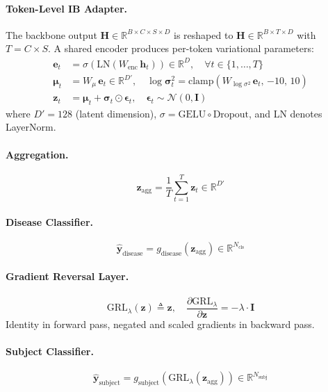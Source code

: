 \documentclass{article}
\newcommand{\R}{\mathbb{R}}
\newcommand{\mN}{\mathcal{N}}
\newcommand{\bz}{\bm{z}}
\newcommand{\bmu}{\bm{\mu}}
\newcommand{\bsigma}{\bm{\sigma}}
\begin{document}
\paragraph{Token-Level IB Adapter.}
The backbone output $\bm{H} \in \R^{B \times C \times S \times D}$ is reshaped to $\bm{H} \in \R^{B \times T \times D}$ with $T = C \times S$.
A shared encoder produces per-token variational parameters:
\begin{align}
\bm{e}_t &= \sigma(\text{LN}(W_\text{enc}\, \bm{h}_t)) \in \R^{D}, \quad \forall t \in \{1, \ldots, T\} \\
\bmu_t &= W_\mu\, \bm{e}_t \in \R^{D'}, \quad
\log\bsigma^2_t = \text{clamp}(W_{\log\sigma^2}\, \bm{e}_t,\, {-10},\, 10) \\
\bz_t &= \bmu_t + \bsigma_t \odot \bm{\epsilon}_t, \quad \bm{\epsilon}_t \sim \mN(0, \bm{I})
\end{align}
where $D' = 128$ (latent dimension), $\sigma = \text{GELU} \circ \text{Dropout}$, and LN denotes LayerNorm.

\paragraph{Aggregation.}
\begin{equation}
\bz_\text{agg} = \frac{1}{T} \sum_{t=1}^{T} \bz_t \in \R^{D'}
\end{equation}

\paragraph{Disease Classifier.}
\begin{equation}
\hat{\bm{y}}_\text{disease} = g_\text{disease}(\bz_\text{agg}) \in \R^{N_\text{cls}}
\end{equation}

\paragraph{Gradient Reversal Layer.}
\begin{equation}
\text{GRL}_\lambda(\bz) \triangleq \bz, \quad
\frac{\partial \text{GRL}_\lambda}{\partial \bz} = -\lambda \cdot \bm{I}
\end{equation}
Identity in forward pass, negated and scaled gradients in backward pass.

\paragraph{Subject Classifier.}
\begin{equation}
\hat{\bm{y}}_\text{subject} = g_\text{subject}(\text{GRL}_\lambda(\bz_\text{agg})) \in \R^{N_\text{subj}}
\end{equation}
\end{document}
